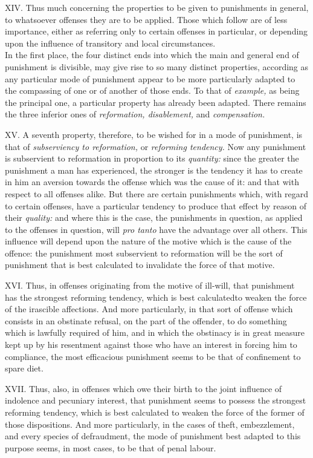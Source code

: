 \documentclass[12pt]{report}
\begin{document}
XIV. Thus much concerning the properties to be given to punishments in
general, to whatsoever offenses they are to be applied. Those which
follow are of less importance, either as referring only to certain
offenses in particular, or depending upon the influence of transitory
and local circumstances.\\
In the first place, the four distinct ends into which the main and
general end of punishment is divisible, may give rise to so many
distinct properties, according as any particular mode of punishment
appear to be more particularly adapted to the compassing of one or of
another of those ends. To that of \emph{example,} as being the principal
one, a particular property has already been adapted. There remains the
three inferior ones of \emph{reformation, disablement,} and
\emph{compensation.}

XV. A seventh property, therefore, to be wished for in a mode of
punishment, is that of \emph{subserviency to reformation,} or
\emph{reforming tendency.} Now any punishment is subservient to
reformation in proportion to its \emph{quantity:} since the greater the
punishment a man has experienced, the stronger is the tendency it has to
create in him an aversion towards the offense which was the cause of it:
and that with respect to all offenses alike. But there are certain
punishments which, with regard to certain offenses, have a particular
tendency to produce that effect by reason of their \emph{quality:} and
where this is the case, the punishments in question, as applied to the
offenses in question, will \emph{pro tanto} have the advantage over all
others. This influence will depend upon the nature of the motive which
is the cause of the offence: the punishment most subservient to
reformation will be the sort of punishment that is best calculated to
invalidate the force of that motive.

XVI. Thus, in offenses originating from the motive of ill-will, that
punishment has the strongest reforming tendency, which is best
calculatedto weaken the force of the irascible affections. And more
particularly, in that sort of offense which consists in an obstinate
refusal, on the part of the offender, to do something which is lawfully
required of him, and in which the obstinacy is in great measure kept up
by his resentment against those who have an interest in forcing him to
compliance, the most efficacious punishment seems to be that of
confinement to spare diet.

XVII. Thus, also, in offenses which owe their birth to the joint
influence of indolence and pecuniary interest, that punishment seems to
possess the strongest reforming tendency, which is best calculated to
weaken the force of the former of those dispositions. And more
particularly, in the cases of theft, embezzlement, and every species of
defraudment, the mode of punishment best adapted to this purpose seems,
in most cases, to be that of penal labour.
\end{document}
